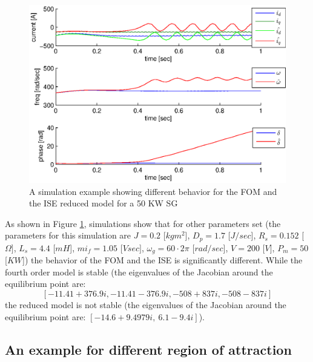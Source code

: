 \documentclass[conference]{IEEEtran}
\renewcommand{\o}    {{\omega}}
\begin{document}
\begin{figure}[ht]
\includegraphics[scale=0.6]{simDiffBehavior1}

\caption{A simulation example showing different behavior for the 
         FOM and the ISE reduced model for a 50 KW SG}
\label{fig:InfBusOne1DiffBehavior1}
\end{figure}

As shown in Figure \ref{fig:InfBusOne1DiffBehavior1}, simulations
show that for other parameters set (the parameters for this simulation
are $J=0.2$ {[}$kgm^{2}${]}, $D_{p}=1.7$ {[}$J/sec${]}, $R_{s}=0.152$
{[}$\Omega]$, $L_{s}=4.4$ {[}$mH${]}, $mi_{f}=1.05$ {[}$Vsec]$,
$\o_g=60\cdotp2\pi$ {[}$rad/sec${]}, $V=200$ {[}$V]$, $P_m=50$
{[}$KW${]}) the behavior of the FOM and the ISE is significantly 
different. While the fourth order model is stable
(the eigenvalues of the Jacobian around the equilibrium point are:
$$\left[-11.41+376.9i,-11.41-376.9i,-508+837i,-508-837i\right]$$
the reduced model is not stable (the eigenvalues of the Jacobian
around the equilibrium point are: 
$\left[-14.6+9.4979i,\:6.1-9.4i\right]$).

\subsection{An example for different region of attraction}
\end{document}
